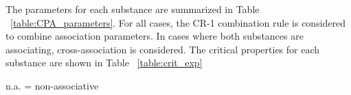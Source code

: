 \documentclass[preprint,12pt,3p]{elsarticle}
\begin{document}
	The parameters for each substance are summarized in Table ~\ref{table:CPA_parameters}. For all cases, the CR-1 combination rule is considered to combine association parameters. In cases where both substances are associating, cross-association is considered. The critical properties for each substance are shown in Table ~\ref{table:crit_exp}

\begin{table}[h!]
\centering
\caption{CPA Parameters used in this work}
\label{table:CPA_parameters}
\raggedright n.a. = non-associative
\end{table}

\begin{table}[h!]
\centering
\caption{Experimental critical data obtained from NIST database \cite{nistfluids} and used as reference}
\label{table:crit_exp}
\end{table}
\end{document}
